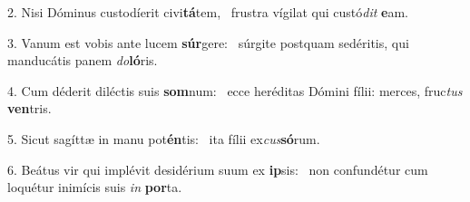 2. Nisi Dóminus custodíerit civi\textbf{tá}tem, \ast\  frustra vígilat qui custó\textit{dit} \textbf{e}am.\

3. Vanum est vobis ante lucem \textbf{súr}gere: \ast\  súrgite postquam sedéritis, qui manducátis panem \textit{do}\textbf{ló}ris.\

4. Cum déderit diléctis suis \textbf{som}num: \ast\  ecce heréditas Dómini fílii: merces, fruc\textit{tus} \textbf{ven}tris.\

5. Sicut sagíttæ in manu pot\textbf{én}tis: \ast\  ita fílii ex\textit{cus}\textbf{só}rum.\

6. Beátus vir qui implévit desidérium suum ex \textbf{ip}sis: \ast\  non confundétur cum loquétur inimícis suis \textit{in} \textbf{por}ta.\

